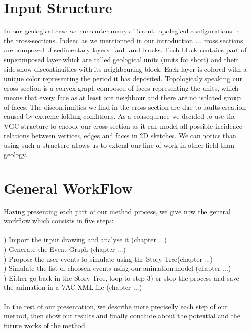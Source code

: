 \documentclass[12pt, a4paper]{memoir} %
\begin{document}
\section{Input Structure}
In our geological case we encounter many different topological configurations in the cross-sections. Indeed as we mentionned in our introduction ... cross sections are composed of sedimentary layers, fault and blocks. Each block contains part of superimposed layer which are called geological units (units for short) and their side show discontinuities with its neighbouring block. Each layer is colored with a unique color representing the period it has deposited. Topologicaly speaking our cross-section is a convex graph composed of faces representing the units, which means that every face as at least one neighbour and there are no isolated group of faces. The discontinuities we find in the cross section are due to faults creation caused by extreme folding conditions. As a consequence we decided to use the VGC \cite{vgc} structure to encode our cross section as it can model all possible incidence relations between vertices, edges and faces in 2D sketches. We can notice than using such a structure allows us to extend our line of work in other field than geology.

\section{General WorkFlow}

Having presenting each part of our method process, we give now the general workflow which consists in 
five steps:\\\\

) Import the input drawing and analyse it (chapter ...)\\
) Generate the Event Graph (chapter ...)\\
) Propose the user events to simulate using the Story Tree(chapter ...)\\
) Simulate the list of choosen events using our animation model (chapter ...)\\
) Either go back in the Story Tree, loop to step 3) or stop the process and save the animation in a VAC XML file\cite{vac} (chapter ...)\\\\
In the rest of our presentation, we describe more preciselly each step of our method, then show our results and finally conclude about the potential and the future works of the method.
 
\end{document}
